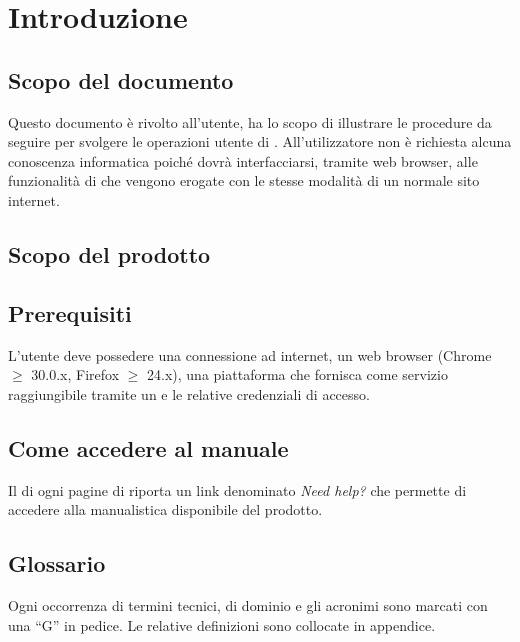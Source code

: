 \section{Introduzione}


	\subsection{Scopo del documento}
	Questo documento è rivolto all'utente, ha lo scopo di illustrare le procedure da seguire per svolgere le operazioni utente di . All'utilizzatore non è richiesta alcuna conoscenza informatica poiché dovrà interfacciarsi, tramite web browser, alle funzionalità di  che vengono erogate con le stesse modalità di un normale sito internet.

	\subsection{Scopo del prodotto}
	\ScopoDelProdotto{}

	\subsection{Prerequisiti}
	L'utente deve possedere una connessione ad internet, un web browser (Chrome $\geq$ 30.0.x, Firefox $\geq$ 24.x), una piattaforma che fornisca  come servizio raggiungibile tramite un \texttt{} e le relative credenziali di accesso.

	\subsection{Come accedere al manuale}
	Il  di ogni pagine di  riporta un link denominato \emph{Need help?} che permette di accedere alla manualistica disponibile del prodotto.
	


	\subsection{Glossario}
	Ogni occorrenza di termini tecnici, di dominio e gli acronimi sono marcati con una ``G'' in pedice. Le relative definizioni sono collocate in appendice.





